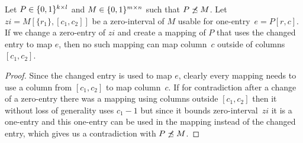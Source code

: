 \begin{obs}
Let $P\in\{0,1\}^{k\times l}$ and $M\in\{0,1\}^{m\times n}$ such that $P\not\preceq M$. Let $zi=M[\{r_1\},[c_1,c_2]]$ be a zero-interval of $M$ usable for one-entry~$e=P[r,c]$. If we change a zero-entry of $zi$ and create a mapping of $P$ that uses the changed entry to map $e$, then no such mapping can map column~$c$ outside of columns $[c_1,c_2]$. 
\end{obs}
\begin{proof}
Since the changed entry is used to map $e$, clearly every mapping needs to use a column from $[c_1,c_2]$ to map column~$c$. If for contradiction after a change of a zero-entry there was a mapping using columns outside $[c_1,c_2]$ then it without loss of generality uses $c_1-1$ but since it bounds zero-interval~$zi$ it is a one-entry and this one-entry can be used in the mapping instead of the changed entry, which gives us a contradiction with $P\not\preceq M$.
\end{proof}

